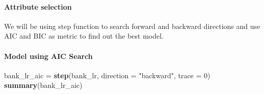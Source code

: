\documentclass[
]{article}
\newenvironment{Shaded}{\begin{snugshade}}{\end{snugshade}}
\newcommand{\DataTypeTok}[1]{\textcolor[rgb]{0.13,0.29,0.53}{#1}}
\newcommand{\DecValTok}[1]{\textcolor[rgb]{0.00,0.00,0.81}{#1}}
\newcommand{\KeywordTok}[1]{\textcolor[rgb]{0.13,0.29,0.53}{\textbf{#1}}}
\newcommand{\NormalTok}[1]{#1}
\newcommand{\StringTok}[1]{\textcolor[rgb]{0.31,0.60,0.02}{#1}}
\begin{document}
\hypertarget{attribute-selection}{%
\paragraph{Attribute selection}\label{attribute-selection}}

We will be using step function to search forward and backward directions
and use AIC and BIC as metric to find out the best model.

\hypertarget{model-using-aic-search}{%
\paragraph{Model using AIC Search}\label{model-using-aic-search}}

\begin{Shaded}
\begin{Highlighting}[]
\NormalTok{bank_lr_aic =}\StringTok{ }\KeywordTok{step}\NormalTok{(bank_lr, }\DataTypeTok{direction =} \StringTok{"backward"}\NormalTok{, }\DataTypeTok{trace =} \DecValTok{0}\NormalTok{)}
\KeywordTok{summary}\NormalTok{(bank_lr_aic)}
\end{Highlighting}
\end{Shaded}
\end{document}
